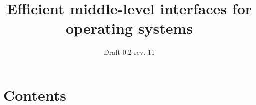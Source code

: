 \documentclass[a4paper,utf8,11pt]{article}
\title{Efficient middle-level interfaces for operating systems}
\author{}
\date{Draft 0.2 rev. 11}
\begin{document}
	\maketitle
	
	
	\section{Contents}
	\tableofcontents
	
	
	
	
	
	
	
	
	
\end{document}
